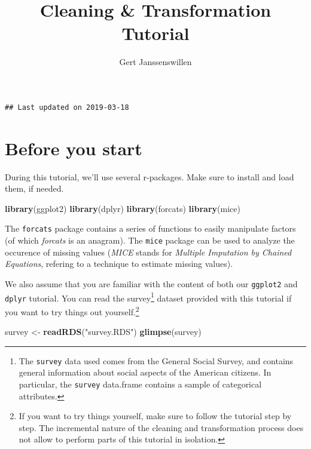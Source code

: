 \documentclass[]{tufte-book}
\title{Cleaning \& Transformation Tutorial}
\author{Gert Janssenswillen}
\date{}
\newenvironment{Shaded}{}{}
\newcommand{\KeywordTok}[1]{\textcolor[rgb]{0.00,0.44,0.13}{\textbf{#1}}}
\newcommand{\StringTok}[1]{\textcolor[rgb]{0.25,0.44,0.63}{#1}}
\newcommand{\NormalTok}[1]{#1}
\begin{document}
\maketitle



{
\setcounter{tocdepth}{1}
\tableofcontents
}

\begin{verbatim}
## Last updated on 2019-03-18
\end{verbatim}

\chapter*{Before you start}\label{before-you-start}

During this tutorial, we'll use several r-packages. Make sure to install
and load them, if needed.

\begin{Shaded}
\begin{Highlighting}[]
\KeywordTok{library}\NormalTok{(ggplot2)}
\KeywordTok{library}\NormalTok{(dplyr)}
\KeywordTok{library}\NormalTok{(forcats)}
\KeywordTok{library}\NormalTok{(mice)}
\end{Highlighting}
\end{Shaded}

The \texttt{forcats} package contains a series of functions to easily
manipulate factors (of which \emph{forcats} is an anagram). The
\texttt{mice} package can be used to analyze the occurence of missing
values (\emph{MICE} stands for \emph{Multiple Imputation by Chained
Equations}, refering to a technique to estimate missing values).

We also assume that you are familiar with the content of both our
\texttt{ggplot2} and \texttt{dplyr} tutorial. You can read the
survey\footnote{The \texttt{survey} data used comes from the General
  Social Survey, and contains general information about social aspects
  of the American citizens. In particular, the \texttt{survey}
  data.frame contains a sample of categorical attributes.} dataset
provided with this tutorial if you want to try things out
yourself.\footnote{If you want to try things yourself, make sure to
  follow the tutorial step by step. The incremental nature of the
  cleaning and transformation process does not allow to perform parts of
  this tutorial in isolation.}

\begin{Shaded}
\begin{Highlighting}[]
\NormalTok{survey <-}\StringTok{ }\KeywordTok{readRDS}\NormalTok{(}\StringTok{"survey.RDS"}\NormalTok{)}
\KeywordTok{glimpse}\NormalTok{(survey)}
\end{Highlighting}
\end{Shaded}
\end{document}

